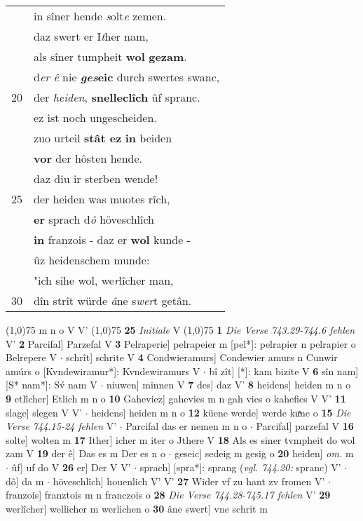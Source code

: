 \documentclass[8pt,a4paper,notitlepage]{article}
\begin{document}
\begin{table}[ht]
\begin{minipage}[t]{0.5\linewidth}
\begin{tabular}{rl}
 & in sîner hende \textit{s}olt\textit{e} zemen.\\ 
 & daz swert er I\textit{t}her nam,\\ 
 & als sîner tumpheit \textbf{wol} \textbf{gezam}.\\ 
 & d\textit{er} \textit{ê} nie \textbf{\textit{ges}eic} durch swertes swanc,\\ 
20 & der \textit{heiden}, \textbf{snelleclîch} ûf spranc.\\ 
 & ez ist noch ungescheiden.\\ 
 & zuo urteil \textbf{stât ez} \textbf{in} beiden\\ 
 & \textbf{vor} der hôsten hende.\\ 
 & daz diu ir sterben wende!\\ 
25 & der heiden was muotes rîch,\\ 
 & \textbf{er} sprach d\textit{ô} höveschlîch\\ 
 & \textbf{in} franzois - daz er \textbf{wol} kunde -\\ 
 & ûz heidenschem munde:\\ 
 & "ich sihe wol, we\textit{r}lîcher man,\\ 
30 & dîn strît würde \textit{â}ne s\textit{wer}t getân.\\ 
\end{tabular}
\scriptsize
\line(1,0){75} \newline
m n o V V' \newline
\line(1,0){75} \newline
\textbf{25} \textit{Initiale} V  \newline
\line(1,0){75} \newline
\textbf{1} \textit{Die Verse 743.29-744.6 fehlen} V'  \textbf{2} Parcifal] Parzefal V \textbf{3} Pelraperie] pelrapeier m [pel*]: pelrapier n pelrapier o Belrepere V  $\cdot$ schrît] schrite V \textbf{4} Condwieramurs] Condewier amurs n Cunwir amúrs o [Kvndewiramur*]: Kvndewiramurs V  $\cdot$ bî zît] [*]: kam bizite V \textbf{6} sîn nam] [S* nam*]: Sv́ nam V  $\cdot$ niuwen] minnen V \textbf{7} des] daz V' \textbf{8} heidens] heiden m n o \textbf{9} etlîcher] Etlich m n o \textbf{10} Gaheviez] gahevies m n gah vies o kahefies V V' \textbf{11} slage] slegen V V'  $\cdot$ heidens] heiden m n o \textbf{12} küene werde] werde kuͯne o \textbf{15} \textit{Die Verse 744.15-24 fehlen} V'   $\cdot$ Parcifal das er nemen m n o  $\cdot$ Parcifal] parzefal V \textbf{16} solte] wolten m \textbf{17} Ither] icher m iter o Jthere V \textbf{18} Als es siner tvmpheit do wol zam V \textbf{19} der ê] Das es m Der es n o  $\cdot$ geseic] sedeig m gesig o \textbf{20} heiden] \textit{om.} m  $\cdot$ ûf] uf do V \textbf{26} er] Der V V'  $\cdot$ sprach] [spra*]: sprang (\textit{vgl. 744.20: } spranc) V'  $\cdot$ dô] da m  $\cdot$ höveschlîch] houenlich V' V' \textbf{27} Wider vf zu hant zv fromen V'  $\cdot$ franzois] franztois m n franczois o \textbf{28} \textit{Die Verse 744.28-745.17 fehlen} V'  \textbf{29} werlîcher] wellicher m werlichen o \textbf{30} âne swert] vne schrit m \newline
\end{minipage}
\end{table}
\end{document}
